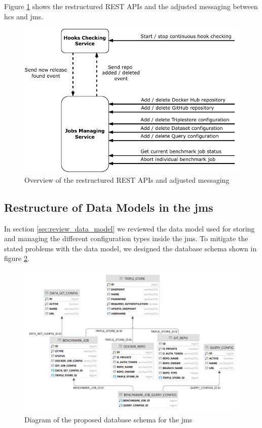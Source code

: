 Figure \ref{fig:repo_management_restructure} shows the restructured REST APIs and the adjusted messaging between \ac{hcs} and \ac{jms}.

\begin{figure}[tbph]
	\centering
	\includegraphics[width=.65\textwidth]{figures/messaging-implementation-hcs-jms.pdf}
	\caption{Overview of the restructured REST APIs and adjusted messaging}
	\label{fig:repo_management_restructure}
\end{figure}



\subsection{Restructure of Data Models in the \acl{jms}}
\label{sec:data_model_restructure_jms}
In section \ref{sec:review_data_model} we reviewed the data model used for storing and managing the different configuration types inside the \ac{jms}.
To mitigate the stated problems with the data model, we designed the database schema shown in figure \ref{fig:design_jms_db_schema}.

\begin{figure}[tbph]
	\centering
	\includegraphics[width=.95\textwidth]{figures/jms_db_schema_design.png}
	\caption{Diagram of the proposed database schema for the \ac{jms}}
	\label{fig:design_jms_db_schema}
\end{figure}


